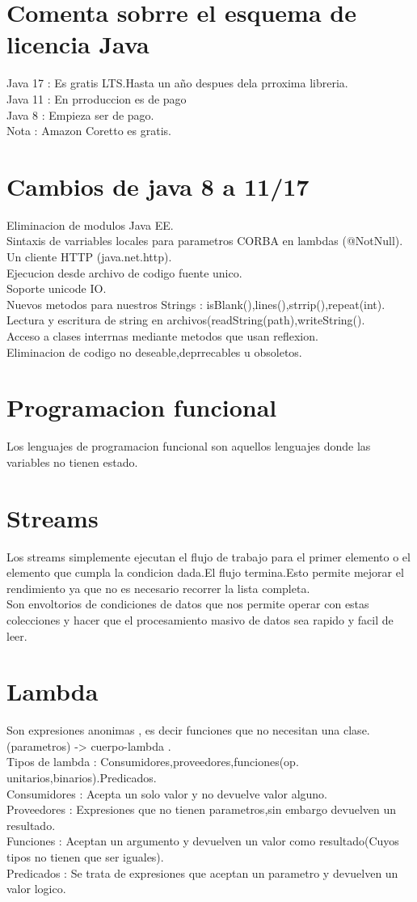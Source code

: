 \section{Comenta sobrre el esquema de licencia Java}
Java 17 : Es gratis LTS.Hasta un año despues dela prroxima libreria.\\
Java 11 : En prroduccion es de pago\\
Java 8 : Empieza ser de pago.\\
Nota : Amazon Coretto es gratis.
\section{Cambios de java 8 a 11/17}
Eliminacion de modulos Java EE.\\
Sintaxis de varriables locales para parametros CORBA en lambdas (@NotNull).\\
Un cliente HTTP (java.net.http).\\
Ejecucion desde archivo de codigo fuente unico.\\
Soporte unicode IO.\\
Nuevos metodos para nuestros Strings : isBlank(),lines(),strrip(),repeat(int).\\
Lectura y escritura de string en archivos(readString(path),writeString().\\
Acceso a clases interrnas mediante metodos que usan reflexion.\\
Eliminacion de codigo no deseable,deprrecables u obsoletos.
\section{Programacion funcional}
Los lenguajes de programacion funcional son aquellos lenguajes donde las variables no tienen estado.
\section{Streams}
Los streams simplemente ejecutan el flujo de trabajo para el primer elemento o el elemento que cumpla
la condicion dada.El flujo termina.Esto permite mejorar el rendimiento ya que no es necesario recorrer
 la lista completa.\\
 Son envoltorios de condiciones de datos que nos permite operar con estas colecciones y hacer que el procesamiento
 masivo de datos sea rapido y facil de leer.
\section{Lambda}
Son expresiones anonimas , es decir funciones que no necesitan una clase. (parametros) -> { cuerpo-lambda} .\\
Tipos de lambda : Consumidores,proveedores,funciones(op. unitarios,binarios).Predicados.\\
Consumidores : Acepta un solo valor y no devuelve valor alguno.\\
Proveedores : Expresiones que no tienen parametros,sin embargo devuelven un resultado.\\
Funciones : Aceptan un argumento y devuelven un valor como resultado(Cuyos tipos no tienen que ser iguales).\\
Predicados : Se trata de expresiones que aceptan un parametro y devuelven un valor logico. 
